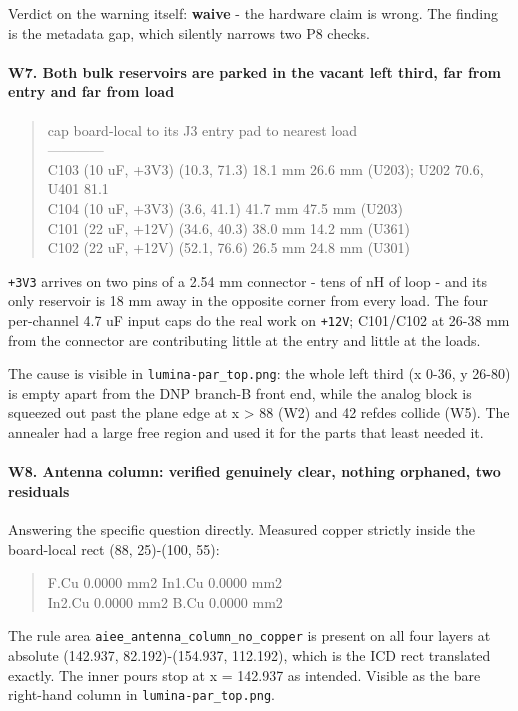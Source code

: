 \documentclass[11pt,a4paper]{article}
\begin{document}
Verdict on the warning itself: \textbf{waive} - the hardware claim is wrong. The finding is the metadata gap, which silently narrows two P8 checks.

\paragraph*{W7. Both bulk reservoirs are parked in the vacant left third, far from entry and far from load}
\begin{quote}\small\ttfamily\raggedright
\textbar{} cap \textbar{} board-local \textbar{} to its J3 entry pad \textbar{} to nearest load \textbar{}\\
\textbar{}---\textbar{}---\textbar{}---\textbar{}---\textbar{}\\
\textbar{} C103 (10 uF, +3V3) \textbar{} (10.3, 71.3) \textbar{} 18.1 mm \textbar{} 26.6 mm (U203); U202 70.6, U401 81.1 \textbar{}\\
\textbar{} C104 (10 uF, +3V3) \textbar{} (3.6, 41.1) \textbar{} 41.7 mm \textbar{} 47.5 mm (U203) \textbar{}\\
\textbar{} C101 (22 uF, +12V) \textbar{} (34.6, 40.3) \textbar{} 38.0 mm \textbar{} 14.2 mm (U361) \textbar{}\\
\textbar{} C102 (22 uF, +12V) \textbar{} (52.1, 76.6) \textbar{} 26.5 mm \textbar{} 24.8 mm (U301) \textbar{}
\end{quote}
\texttt{+3V3} arrives on two pins of a 2.54 mm connector - tens of nH of loop - and its only reservoir is 18 mm away in the opposite corner from every load. The four per-channel 4.7 uF input caps do the real work on \texttt{+12V}; C101/C102 at 26-38 mm from the connector are contributing little at the entry and little at the loads.

The cause is visible in \texttt{lumina-par\_top.png}: the whole left third (x 0-36, y 26-80) is empty apart from the DNP branch-B front end, while the analog block is squeezed out past the plane edge at x \textgreater{} 88 (W2) and 42 refdes collide (W5). The annealer had a large free region and used it for the parts that least needed it.

\paragraph*{W8. Antenna column: verified genuinely clear, nothing orphaned, two residuals}
Answering the specific question directly. Measured copper strictly inside the board-local rect (88, 25)-(100, 55):

\begin{quote}\small\ttfamily\raggedright
F.Cu   0.0000 mm2      In1.Cu 0.0000 mm2\\
In2.Cu 0.0000 mm2      B.Cu   0.0000 mm2
\end{quote}
The rule area \texttt{aiee\_antenna\_column\_no\_copper} is present on all four layers at absolute (142.937, 82.192)-(154.937, 112.192), which is the ICD rect translated exactly. The inner pours stop at x = 142.937 as intended. Visible as the bare right-hand column in \texttt{lumina-par\_top.png}.
\end{document}
